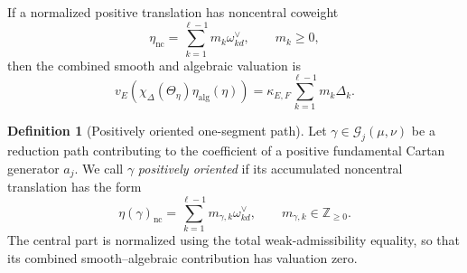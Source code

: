 \documentclass[12pt]{article}
\theoremstyle{definition}
\newtheorem{definition}[theorem]{Definition}
\theoremstyle{remark}
\begin{document}
If a normalized positive translation has noncentral coweight
\[
 \eta_{\mathrm{nc}}
 =
 \sum_{k=1}^{\ell-1}
 m_k\omega_{kd}^\vee,
 \qquad
 m_k\geq0,
\]
then the combined smooth and algebraic valuation is
\begin{equation}\label{eq:one-segment-translation}
 \boxed{
 v_E\left(
 \chi_\Delta(\Theta_\eta)
 \eta_{\mathrm{alg}}(\eta)
 \right)
 =
 \kappa_{E,F}
 \sum_{k=1}^{\ell-1}m_k\Delta_k.
 }
\end{equation}

\begin{definition}[Positively oriented one-segment path]
\label{def:positively-oriented-one-segment-path}
Let \(\gamma\in\mathcal G_j(\mu,\nu)\) be a reduction path contributing to
the coefficient of a positive fundamental Cartan generator \(a_j\).  We call
\(\gamma\) \emph{positively oriented} if its accumulated noncentral
translation has the form
\begin{equation}\label{eq:positive-one-segment-path-translation}
 \eta(\gamma)_{\mathrm{nc}}
 =
 \sum_{k=1}^{\ell-1}
 m_{\gamma,k}\omega_{kd}^\vee,
 \qquad
 m_{\gamma,k}\in\mathbb Z_{\geq0}.
\end{equation}
The central part is normalized using the total weak-admissibility equality,
so that its combined smooth--algebraic contribution has valuation zero.
\end{definition}
\end{document}

